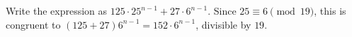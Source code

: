 Write the expression as $125\cdot25^{n-1}+27\cdot6^{n-1}$. Since $25\equiv6\pmod{19}$, this is congruent to $(125+27)6^{n-1}=152\cdot6^{n-1}$, divisible by $19$.
